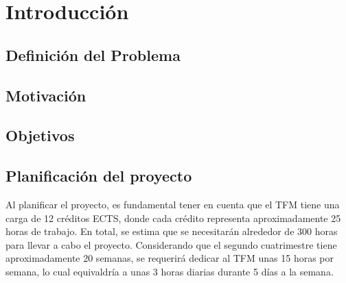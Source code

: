 \chapter{Introducción}
\section{Definición del Problema}   
\section{Motivación}
\section{Objetivos}
\section{Planificación del proyecto}
Al planificar el proyecto, es fundamental tener en cuenta que el TFM 
tiene una carga de 12 créditos ECTS, donde cada 
crédito representa aproximadamente 25 horas de trabajo. 
En total, se estima que se necesitarán alrededor de 300 horas para llevar a cabo 
el proyecto.  Considerando que el segundo cuatrimestre tiene aproximadamente 20 semanas, 
se requerirá dedicar al TFM unas 15 horas por semana, lo cual equivaldría a unas 3 horas 
diarias durante 5 días a la semana.

